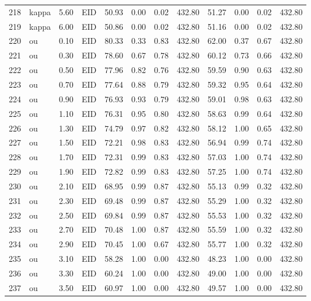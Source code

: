 \begin{table}[ht]
\begin{tabular}{rlrlrrrrrrrr}
  218 & kappa & 5.60 & EID & 50.93 & 0.00 & 0.02 & 432.80 & 51.27 & 0.00 & 0.02 & 432.80 \\ 
  219 & kappa & 6.00 & EID & 50.86 & 0.00 & 0.02 & 432.80 & 51.16 & 0.00 & 0.02 & 432.80 \\ 
  220 & ou & 0.10 & EID & 80.33 & 0.33 & 0.83 & 432.80 & 62.00 & 0.37 & 0.67 & 432.80 \\ 
  221 & ou & 0.30 & EID & 78.60 & 0.67 & 0.78 & 432.80 & 60.12 & 0.73 & 0.66 & 432.80 \\ 
  222 & ou & 0.50 & EID & 77.96 & 0.82 & 0.76 & 432.80 & 59.59 & 0.90 & 0.63 & 432.80 \\ 
  223 & ou & 0.70 & EID & 77.64 & 0.88 & 0.79 & 432.80 & 59.32 & 0.95 & 0.64 & 432.80 \\ 
  224 & ou & 0.90 & EID & 76.93 & 0.93 & 0.79 & 432.80 & 59.01 & 0.98 & 0.63 & 432.80 \\ 
  225 & ou & 1.10 & EID & 76.31 & 0.95 & 0.80 & 432.80 & 58.63 & 0.99 & 0.64 & 432.80 \\ 
  226 & ou & 1.30 & EID & 74.79 & 0.97 & 0.82 & 432.80 & 58.12 & 1.00 & 0.65 & 432.80 \\ 
  227 & ou & 1.50 & EID & 72.21 & 0.98 & 0.83 & 432.80 & 56.94 & 0.99 & 0.74 & 432.80 \\ 
  228 & ou & 1.70 & EID & 72.31 & 0.99 & 0.83 & 432.80 & 57.03 & 1.00 & 0.74 & 432.80 \\ 
  229 & ou & 1.90 & EID & 72.82 & 0.99 & 0.83 & 432.80 & 57.25 & 1.00 & 0.74 & 432.80 \\ 
  230 & ou & 2.10 & EID & 68.95 & 0.99 & 0.87 & 432.80 & 55.13 & 0.99 & 0.32 & 432.80 \\ 
  231 & ou & 2.30 & EID & 69.48 & 0.99 & 0.87 & 432.80 & 55.29 & 1.00 & 0.32 & 432.80 \\ 
  232 & ou & 2.50 & EID & 69.84 & 0.99 & 0.87 & 432.80 & 55.53 & 1.00 & 0.32 & 432.80 \\ 
  233 & ou & 2.70 & EID & 70.48 & 1.00 & 0.87 & 432.80 & 55.59 & 1.00 & 0.32 & 432.80 \\ 
  234 & ou & 2.90 & EID & 70.45 & 1.00 & 0.67 & 432.80 & 55.77 & 1.00 & 0.32 & 432.80 \\ 
  235 & ou & 3.10 & EID & 58.28 & 1.00 & 0.00 & 432.80 & 48.23 & 1.00 & 0.00 & 432.80 \\ 
  236 & ou & 3.30 & EID & 60.24 & 1.00 & 0.00 & 432.80 & 49.00 & 1.00 & 0.00 & 432.80 \\ 
  237 & ou & 3.50 & EID & 60.97 & 1.00 & 0.00 & 432.80 & 49.57 & 1.00 & 0.00 & 432.80 \\ 

\end{tabular}
\end{table}
